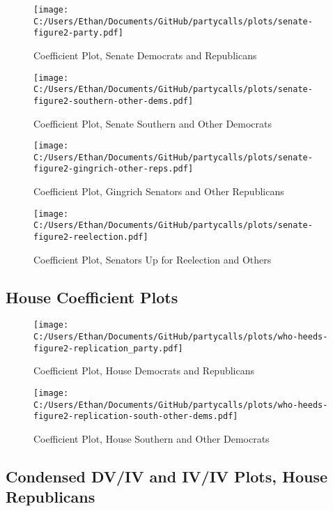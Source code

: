 \documentclass[12pt]{article}
\begin{document}
\begin{figure}[ht]
	\centering
	\caption{Coefficient Plot, Senate Democrats and Republicans}
	\texttt{[image: C:/Users/Ethan/Documents/GitHub/partycalls/plots/senate-figure2-party.pdf]}
\end{figure}

\begin{figure}[ht]
	\centering
	\caption{Coefficient Plot, Senate Southern and Other Democrats}
	\texttt{[image: C:/Users/Ethan/Documents/GitHub/partycalls/plots/senate-figure2-southern-other-dems.pdf]}
\end{figure}

\begin{figure}[ht]
	\centering
	\caption{Coefficient Plot, Gingrich Senators and Other Republicans}
	\texttt{[image: C:/Users/Ethan/Documents/GitHub/partycalls/plots/senate-figure2-gingrich-other-reps.pdf]}
\end{figure}

\begin{figure}[ht]
	\centering
	\caption{Coefficient Plot, Senators Up for Reelection and Others}
	\texttt{[image: C:/Users/Ethan/Documents/GitHub/partycalls/plots/senate-figure2-reelection.pdf]}
\end{figure}

\clearpage

\subsection{House Coefficient Plots}

\begin{figure}[ht]
	\centering
	\caption{Coefficient Plot, House Democrats and Republicans}
	\texttt{[image: C:/Users/Ethan/Documents/GitHub/partycalls/plots/who-heeds-figure2-replication\_party.pdf]}
\end{figure}

\begin{figure}[ht]
	\centering
	\caption{Coefficient Plot, House Southern and Other Democrats}
	\texttt{[image: C:/Users/Ethan/Documents/GitHub/partycalls/plots/who-heeds-figure2-replication-south-other-dems.pdf]}
\end{figure}

\clearpage

\subsection{Condensed DV/IV and IV/IV Plots, House Republicans}
\end{document}
